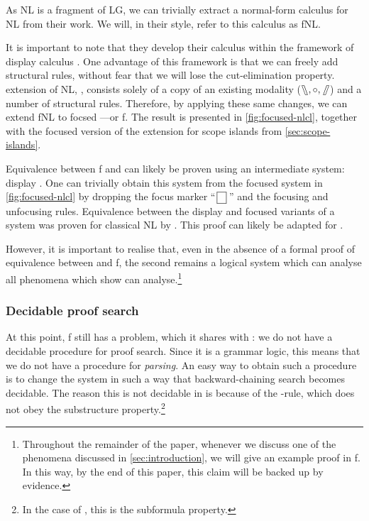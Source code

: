 \documentclass[10pt,a4paper]{llncs}
\begin{document}
As NL is a fragment of LG, we can trivially extract a normal-form
calculus for NL from their work.
We will, in their style, refer to this calculus as fNL.

It is important to note that they develop their calculus within the
framework of display calculus \citep{belnap1982}.
One advantage of this framework is that we can freely add structural
rules, without fear that we will lose the cut-elimination property.
 extension of NL, {\NLCL}, consists solely of a copy
of an existing modality ($\fatbslash,\mathbin{\circ},\mathbin{\!\fatslash\,}$) and a number of
structural rules.
Therefore, by applying these same changes, we can extend fNL to focsed
{\NLCL}---or {f\NLCL}.
The result is presented in \autoref{fig:focused-nlcl},
together with the focused version of the extension for scope islands
from \autoref{sec:scope-islands}.



Equivalence between {f\NLCL} and {\NLCL} can likely be proven using
an intermediate system: display {\NLCL}. One can trivially obtain this
system from the focused system in \autoref{fig:focused-nlcl} by
dropping the focus marker ``$\,\boxed{ \phantom{\cdot} }\,$'' and the
focusing and unfocusing rules.
Equivalence between the display and focused variants of a system was
proven for classical NL by \citet{bastenhof2011}.
This proof can likely be adapted for {\NLCL}.

However, it is important to realise that, even in the absence of a
formal proof of equivalence between {\NLCL} and {f\NLCL}, the second
remains a logical system which can analyse all phenomena which
\citet{barker2015} show {\NLCL} can analyse.\footnote{%
  Throughout the remainder of the paper, whenever we discuss one of
  the phenomena discussed in \autoref{sec:introduction}, we will give
  an example proof in {f\NLCL}. In this way, by the end of this paper,
  this claim will be backed up by evidence.
}

\subsubsection{Decidable proof search}%
\label{sec:decidable-proof-search}

At this point, {f\NLCL} still has a problem, which it shares with
{\NLCL}: we do not have a decidable procedure for proof search.
Since it is a grammar logic, this means that we do not have a
procedure for \emph{parsing}.
An easy way to obtain such a procedure is to change the system in such
a way that backward-chaining search becomes decidable. The reason this
is not decidable in {\NLCL} is because of the \I-rule, which does not
obey the substructure property.\footnote{%
  In the case of {\NLCL}, this is the subformula property.
}
\end{document}
